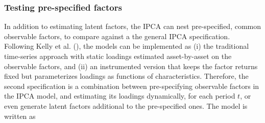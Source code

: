 \documentclass[
  12pt,
  a4paper,
  openany]{scrbook}
\begin{document}
\subsubsection{Testing pre-specified
factors}\label{testing-pre-specified-factors}

In addition to estimating latent factors, the IPCA can nest
pre-specified, common observable factors, to compare against a the
general IPCA specification. Following Kelly et al.
(), the models can be
implemented as (i) the traditional time-series approach with static
loadings estimated asset-by-asset on the observable factors, and (ii) an
instrumented version that keeps the factor returns fixed but
parameterizes loadings as functions of characteristics. Therefore, the
second specification is a combination between pre-specifying observable
factors in the IPCA model, and estimating its loadings dynamically, for
each period \(t\), or even generate latent factors additional to the
pre-specified ones. The model is written as
\end{document}
